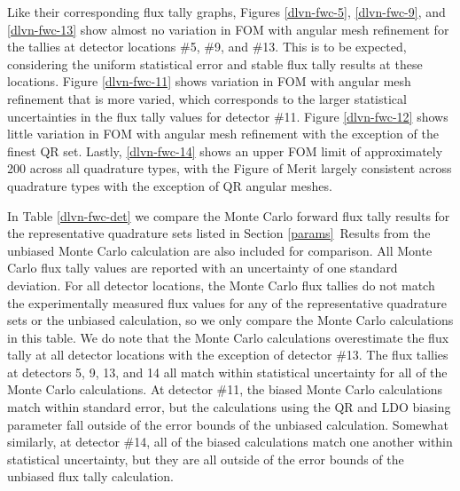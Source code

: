 \documentclass{article} %
\begin{document}
Like their corresponding flux tally graphs, Figures \ref{dlvn-fwc-5},
\ref{dlvn-fwc-9}, and \ref{dlvn-fwc-13} show almost no variation in FOM with
angular mesh refinement for the tallies at detector locations \#5, \#9, and
\#13. This is to be expected, considering the uniform statistical error and
stable flux tally results at these locations. Figure \ref{dlvn-fwc-11} shows
variation in FOM with angular mesh refinement that is more varied, which
corresponds to the larger statistical uncertainties in the flux tally values
for detector \#11. Figure \ref{dlvn-fwc-12} shows little variation in FOM with
angular mesh refinement with the exception of the finest QR set. Lastly,
\ref{dlvn-fwc-14} shows an upper FOM limit of approximately 200 across all
quadrature types, with the Figure of Merit largely consistent across
quadrature types with the exception of QR angular meshes.

In Table \ref{dlvn-fwc-det} we compare the Monte Carlo forward flux tally
results for the representative quadrature sets listed in Section \ref{params}\
Results from the unbiased Monte Carlo calculation are also included for
comparison. All Monte Carlo flux tally values are reported with an uncertainty
of one standard deviation. For all detector locations, the Monte Carlo flux
tallies do not match the experimentally measured flux values for any of the
representative quadrature sets or the unbiased calculation, so we only compare
the Monte Carlo calculations in this table. We do note that the Monte Carlo
calculations overestimate the flux tally at all detector locations with the
exception of detector \#13. The flux tallies at detectors 5, 9, 13, and 14 all
match within statistical uncertainty for all of the Monte Carlo calculations.
At detector \#11, the biased Monte Carlo calculations match within standard
error, but the calculations using the QR and LDO biasing parameter fall outside
of the error bounds of the unbiased calculation. Somewhat similarly, at
detector \#14, all of the biased calculations match one another within
statistical uncertainty, but they are all outside of the error bounds of the
unbiased flux tally calculation.
\end{document}
